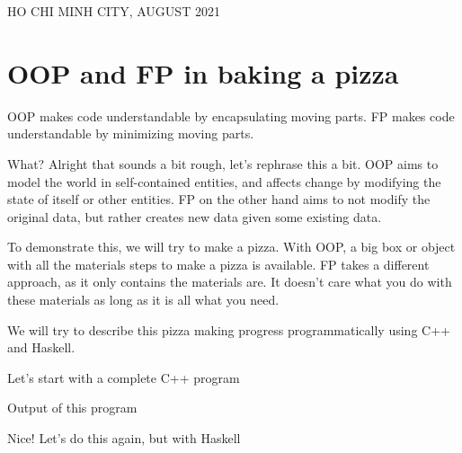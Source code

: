 \documentclass[a4paper]{article}
\numberwithin{equation}{section}
\begin{document}
\begin{titlepage}
  \begin{center}
    {\footnotesize HO CHI MINH CITY, AUGUST 2021}
  \end{center}
\end{titlepage}




\section{OOP and FP in baking a pizza}
OOP makes code understandable by encapsulating moving parts.
FP makes code understandable by minimizing moving parts.

What? Alright that sounds a bit rough, let's rephrase this a bit.
OOP aims to model the world in self-contained entities, and affects change by modifying the state of itself or other entities.
FP on the other hand aims to not modify the original data, but rather creates new data given some existing data.

To demonstrate this, we will try to make a pizza.
With OOP, a big box or object with all the materials steps to make a pizza is available.
FP takes a different approach, as it only contains the materials are. It doesn't care what you do with these materials as long as it is all what you need.

We will try to describe this pizza making progress programmatically using C++ and Haskell.

Let's start with a complete C++ program

Output of this program

Nice! Let's do this again, but with Haskell
\end{document}
